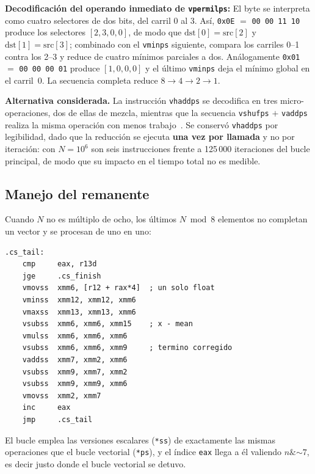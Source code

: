 \documentclass[journal]{IEEEtran}
\begin{document}
\textbf{Decodificación del operando inmediato de \texttt{vpermilps}:}
El byte se interpreta como cuatro selectores de dos bits, del carril 0 al
3. Así, \texttt{0x0E} $=$ \texttt{00 00 11 10} produce los selectores
$[2,3,0,0]$, de modo que $\mathrm{dst}[0] = \mathrm{src}[2]$ y
$\mathrm{dst}[1] = \mathrm{src}[3]$; combinado con el \texttt{vminps}
siguiente, compara los carriles 0--1 contra los 2--3 y reduce de cuatro
mínimos parciales a dos. Análogamente \texttt{0x01} $=$
\texttt{00 00 00 01} produce $[1,0,0,0]$ y el último \texttt{vminps}
deja el mínimo global en el carril~0. La secuencia completa reduce
$8 \to 4 \to 2 \to 1$.

\textbf{Alternativa considerada.} La instrucción \texttt{vhaddps} se
decodifica en tres micro-operaciones, dos de ellas de mezcla, mientras que
la secuencia \texttt{vshufps} $+$ \texttt{vaddps} realiza la misma
operación con menos trabajo~\cite{agner_tables}. Se conservó
\texttt{vhaddps} por legibilidad, dado que la reducción se ejecuta
\textbf{una vez por llamada} y no por iteración: con $N = 10^6$ son seis
instrucciones frente a 125\,000 iteraciones del bucle principal, de modo
que su impacto en el tiempo total no es medible.

\subsection{Manejo del remanente}

Cuando $N$ no es múltiplo de ocho, los últimos $N \bmod 8$ elementos no
completan un vector y se procesan de uno en uno:

\begin{lstlisting}[caption={Bucle de cierre para los elementos sobrantes.},
  label={lst:remanente}]
.cs_tail:
    cmp     eax, r13d
    jge     .cs_finish
    vmovss  xmm6, [r12 + rax*4]  ; un solo float
    vminss  xmm12, xmm12, xmm6
    vmaxss  xmm13, xmm13, xmm6
    vsubss  xmm6, xmm6, xmm15    ; x - mean
    vmulss  xmm6, xmm6, xmm6
    vsubss  xmm6, xmm6, xmm9     ; termino corregido
    vaddss  xmm7, xmm2, xmm6
    vsubss  xmm9, xmm7, xmm2
    vsubss  xmm9, xmm9, xmm6
    vmovss  xmm2, xmm7
    inc     eax
    jmp     .cs_tail
\end{lstlisting}

El bucle emplea las versiones escalares (\texttt{*ss}) de exactamente las
mismas operaciones que el bucle vectorial (\texttt{*ps}), y el índice
\texttt{eax} llega a él valiendo $n \mathbin{\&} \mathord{\sim}7$, es
decir justo donde el bucle vectorial se detuvo.
\end{document}
